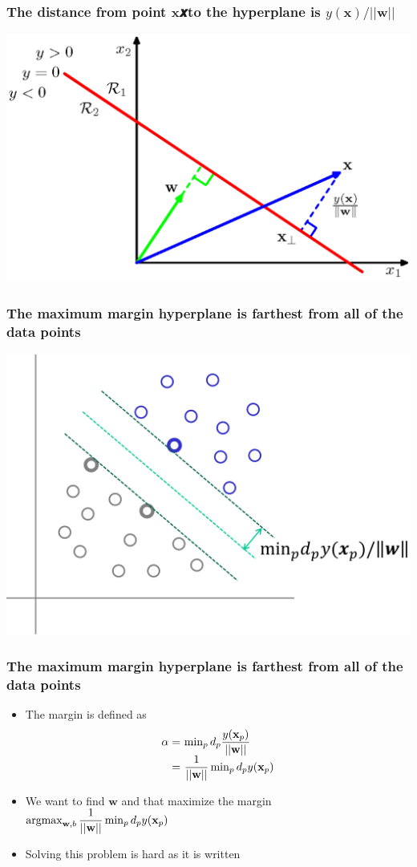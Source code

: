 \documentclass[12pt,notes,mathserif]{beamer}
\begin{document}
\begin{frame}[c]
\frametitle{The distance from point $\mathbf{x}$𝒙to the hyperplane is $y(\mathbf{x})/||\mathbf{w}||$}
\begin{center}
\includegraphics[width=0.7\linewidth]{fig8/lec818.jpg}
\end{center}
\end{frame}


\begin{frame}[c]
\frametitle{The maximum margin hyperplane is farthest from all of the data points}
\begin{center}
\includegraphics[width=0.7\linewidth]{fig8/lec819.jpg}
\end{center}
\end{frame}


\begin{frame}[c]
\frametitle{The maximum margin hyperplane is farthest from all of the data points}
\begin{itemize}
\item The margin is defined as
\[
\begin{array}{r@{~}l}
\alpha=&\min_pd_p\dfrac{y(\mathbf{x}_p)}{||\mathbf{w}||}\\
=&\dfrac{1}{||\mathbf{w}||}\min_pd_py(\mathbf{x}_p)
\end{array}
\]
\item We want to find $\mathbf{w}$ and  that maximize the margin $\mathop{\mathrm{argmax}}_{\mathbf{w},b}\dfrac{1}{||\mathbf{w}||} \min_pd_py(\mathbf{x}_p)$
\item Solving this problem is hard as it is written
\end{itemize}
\end{frame}
\end{document}
